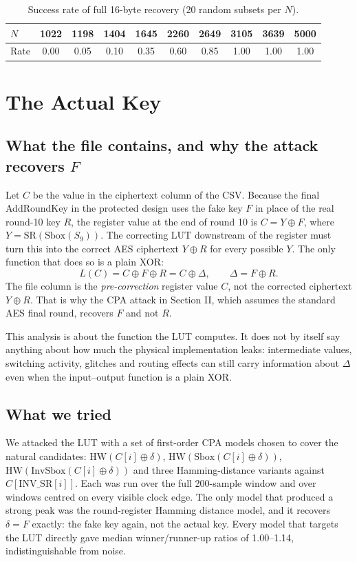 \documentclass[conference,9pt]{IEEEtran}
\newcommand{\HW}{\mathrm{HW}}
\newcommand{\Sb}{\mathrm{Sbox}}
\newcommand{\ISb}{\mathrm{InvSbox}}
\begin{document}
\begin{table}[t]
\centering
\caption{Success rate of full 16-byte recovery (20 random subsets per $N$).}
\label{tab:success}
\begin{tabular}{@{}lccccccccc@{}}
\toprule
$N$ & 1022 & 1198 & 1404 & 1645 & 2260 & 2649 & 3105 & 3639 & 5000\\
\midrule
Rate & 0.00 & 0.05 & 0.10 & 0.35 & 0.60 & 0.85 & 1.00 & 1.00 & 1.00\\
\bottomrule
\end{tabular}
\end{table}

\section{The Actual Key}

\subsection{What the file contains, and why the attack recovers $F$}
Let $C$ be the value in the ciphertext column of the CSV. Because the final AddRoundKey in the protected design uses the fake key $F$ in place of the real round-10 key $R$, the register value at the end of round 10 is $C = Y \oplus F$, where $Y = \mathrm{SR}(\Sb(S_9))$. The correcting LUT downstream of the register must turn this into the correct AES ciphertext $Y \oplus R$ for every possible $Y$. The only function that does so is a plain XOR:
\begin{equation}
L(C) = C \oplus F \oplus R = C \oplus \Delta, \qquad \Delta = F\oplus R.
\end{equation}
The file column is the \emph{pre-correction} register value $C$, not the corrected ciphertext $Y\oplus R$. That is why the CPA attack in Section II, which assumes the standard AES final round, recovers $F$ and not $R$.

This analysis is about the function the LUT computes. It does not by itself say anything about how much the physical implementation leaks: intermediate values, switching activity, glitches and routing effects can still carry information about $\Delta$ even when the input--output function is a plain XOR.

\subsection{What we tried}
We attacked the LUT with a set of first-order CPA models chosen to cover the natural candidates: $\HW(C[i]\oplus\delta)$, $\HW(\Sb(C[i]\oplus\delta))$, $\HW(\ISb(C[i]\oplus\delta))$ and three Hamming-distance variants against $C[\mathrm{INV\_SR}[i]]$. Each was run over the full 200-sample window and over windows centred on every visible clock edge. The only model that produced a strong peak was the round-register Hamming distance model, and it recovers $\delta = F$ exactly: the fake key again, not the actual key. Every model that targets the LUT directly gave median winner/runner-up ratios of 1.00--1.14, indistinguishable from noise.
\end{document}

